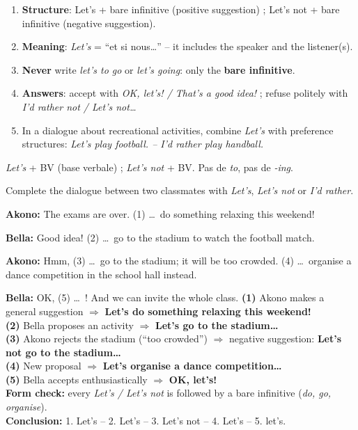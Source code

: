 \documentclass[11pt]{article}
\newcommand{\cle}[1]{{\popxbold\color{popdark}#1}}
\begin{document}
\begin{methode}
\begin{enumerate}
\item \textbf{Structure}: \cle{Let's + bare infinitive} (positive suggestion) ; \cle{Let's not + bare infinitive} (negative suggestion).
\item \textbf{Meaning}: \emph{Let's} = ``et si nous\ldots'' -- it includes the speaker and the listener(s).
\item \textbf{Never} write \emph{let's to go} or \emph{let's going}: only the \textbf{bare infinitive}.
\item \textbf{Answers}: accept with \emph{OK, let's! / That's a good idea!} ; refuse politely with \emph{I'd rather not / Let's not\ldots}
\item In a dialogue about recreational activities, combine \emph{Let's} with preference structures: \emph{Let's play football. -- I'd rather play handball.}
\end{enumerate}
\begin{aretenir}[Forme]
\emph{Let's} + BV (base verbale) ; \emph{Let's not} + BV. Pas de \emph{to}, pas de \emph{-ing}.
\end{aretenir}
\end{methode}

\begin{exoresolu}
Complete the dialogue between two classmates with \emph{Let's}, \emph{Let's not} or \emph{I'd rather}.\par
\textbf{Akono:} The exams are over. (1) \ldots\ do something relaxing this weekend!\par
\textbf{Bella:} Good idea! (2) \ldots\ go to the stadium to watch the football match.\par
\textbf{Akono:} Hmm, (3) \ldots\ go to the stadium; it will be too crowded. (4) \ldots\ organise a dance competition in the school hall instead.\par
\textbf{Bella:} OK, (5) \ldots\ ! And we can invite the whole class.
\tcblower
\textbf{(1)} Akono makes a general suggestion $\Rightarrow$ \textbf{Let's do something relaxing this weekend!}\\
\textbf{(2)} Bella proposes an activity $\Rightarrow$ \textbf{Let's go to the stadium\ldots}\\
\textbf{(3)} Akono rejects the stadium (``too crowded'') $\Rightarrow$ negative suggestion: \textbf{Let's not go to the stadium\ldots}\\
\textbf{(4)} New proposal $\Rightarrow$ \textbf{Let's organise a dance competition\ldots}\\
\textbf{(5)} Bella accepts enthusiastically $\Rightarrow$ \textbf{OK, let's!}\\
\textbf{Form check:} every \emph{Let's / Let's not} is followed by a bare infinitive (\emph{do, go, organise}).\\
\textbf{Conclusion:} 1. Let's -- 2. Let's -- 3. Let's not -- 4. Let's -- 5. let's.
\end{exoresolu}
\end{document}

